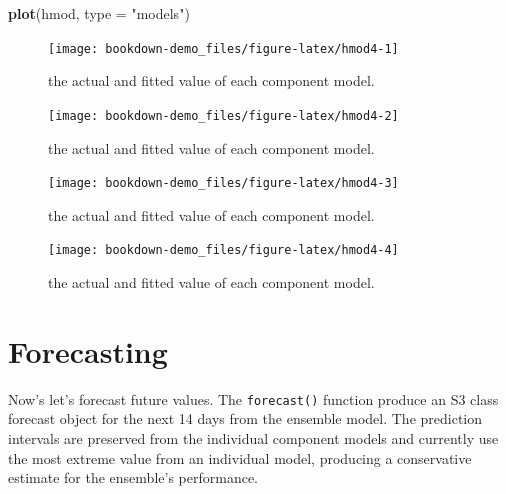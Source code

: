 \documentclass[]{book}
\newenvironment{Shaded}{\begin{snugshade}}{\end{snugshade}}
\newcommand{\KeywordTok}[1]{\textcolor[rgb]{0.13,0.29,0.53}{\textbf{#1}}}
\newcommand{\DataTypeTok}[1]{\textcolor[rgb]{0.13,0.29,0.53}{#1}}
\newcommand{\StringTok}[1]{\textcolor[rgb]{0.31,0.60,0.02}{#1}}
\newcommand{\NormalTok}[1]{#1}
\begin{document}
\begin{Shaded}
\begin{Highlighting}[]
\KeywordTok{plot}\NormalTok{(hmod, }\DataTypeTok{type =} \StringTok{"models"}\NormalTok{)}
\end{Highlighting}
\end{Shaded}

\begin{figure}

{\centering \texttt{[image: bookdown-demo\_files/figure-latex/hmod4-1]} 

}

\caption{the actual and fitted value of each component model.}\label{fig:hmod4-1}
\end{figure}\begin{figure}

{\centering \texttt{[image: bookdown-demo\_files/figure-latex/hmod4-2]} 

}

\caption{the actual and fitted value of each component model.}\label{fig:hmod4-2}
\end{figure}\begin{figure}

{\centering \texttt{[image: bookdown-demo\_files/figure-latex/hmod4-3]} 

}

\caption{the actual and fitted value of each component model.}\label{fig:hmod4-3}
\end{figure}\begin{figure}

{\centering \texttt{[image: bookdown-demo\_files/figure-latex/hmod4-4]} 

}

\caption{the actual and fitted value of each component model.}\label{fig:hmod4-4}
\end{figure}

\section{Forecasting}\label{forecasting}

Now's let's forecast future values. The \texttt{forecast()} function
produce an S3 class forecast object for the next 14 days from the
ensemble model. The prediction intervals are preserved from the
individual component models and currently use the most extreme value
from an individual model, producing a conservative estimate for the
ensemble's performance.
\end{document}
